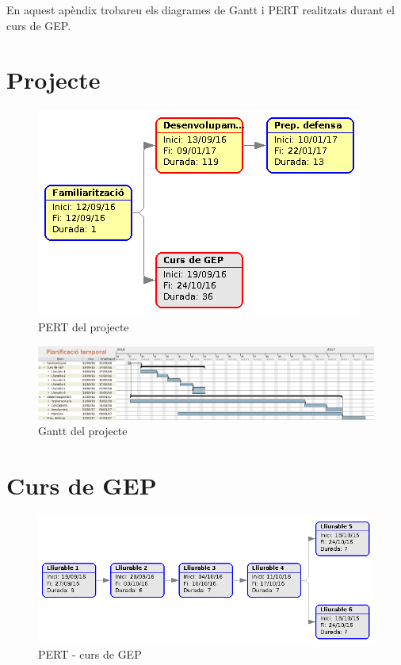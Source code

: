 En aquest apèndix trobareu els diagrames de Gantt i PERT realitzats durant el curs de GEP.
\section{Projecte}
	\begin{figure}[H]
		\centering
		\includegraphics[width=\textwidth]{images/pert-global}
		\caption{PERT del projecte}
	\end{figure}

	\restoregeometry
	\thispagestyle{empty}
	\begin{figure}
		\includegraphics[width=\textheight]{images/gantt}
		\caption{Gantt del projecte}
	\end{figure}


\restoregeometry
{}

\section{Curs de GEP}
	\begin{figure}[H]
		\centering
		\includegraphics[width=\textwidth]{images/pert-gep}
		\caption{PERT - curs de GEP}
	\end{figure}

